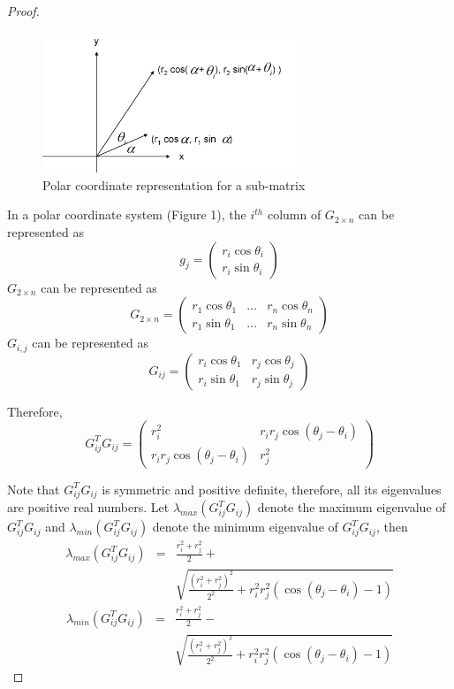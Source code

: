 \documentclass{sig-alternate}
\begin{document}
\begin{proof}
\begin{figure}
\centering
\includegraphics[width=3in]{opt_2erasures.png}
\caption{Polar coordinate representation for a sub-matrix}
\label{polar}
\end{figure}

In a polar coordinate system (Figure 1), the $i^{th}$ column of $G_{2 \times n}$ can be represented as
\[ g_j= \left( \begin{array}{c}
r_i \cos \theta_i  \\
r_i \sin \theta_i  \end{array} \right)\]
$ G_{2 \times n} $ can be represented as 
\[ G_{2 \times n} = \left( \begin{array}{ccc}
r_1 \cos \theta_1 & \ldots & r_n \cos \theta_n \\
r_1 \sin \theta_1 & \ldots & r_n \sin \theta_n    \end{array} \right)\]
$G_{i,j}$ can be represented as 
\[ G_{ij}= \left( \begin{array}{cc}
r_i \cos \theta_1 & r_j \cos \theta_j \\
r_i \sin \theta_1 & r_j \sin \theta_j    \end{array} \right)\]

Therefore,
\[ G_{ij}^T G_{ij}= \left( \begin{array}{cc}
r_i^2 & r_i r_j \cos (\theta_j- \theta_i) \\
r_i r_j \cos (\theta_j- \theta_i) &   r_j^2  \end{array} \right)\]

Note that $G_{ij}^T G_{ij}$ is symmetric and positive definite,
therefore, all its eigenvalues are positive real numbers.
Let $\lambda_{max} (G_{ij}^{T} G_{ij})$ denote the maximum eigenvalue
of $G_{ij}^{T} G_{ij}$ and $\lambda_{min} (G_{ij}^{T} G_{ij})$ denote 
the minimum eigenvalue of $G_{ij}^{T} G_{ij}$, then
\begin{eqnarray*}
\lambda_{max} (G_{ij}^{T} G_{ij})
&=& \frac{ r_{i}^2 + r_{j}^2}{2 } + \\
& &   \sqrt { \frac{ (r_{i}^2 + r_{j}^2)^2}{2^2 } + 
r_{i}^2 r_{j}^2 (\cos (\theta_j - \theta_i)  -1 )}
\end{eqnarray*}
\begin{eqnarray*}
\lambda_{min} (G_{ij}^{T} G_{ij})
&=& \frac{ r_{i}^2 + r_{j}^2}{2 } - \\
& &  \sqrt { \frac{ (r_{i}^2 + r_{j}^2)^2}{2^2 } + 
r_{i}^2 r_{j}^2 (\cos (\theta_j - \theta_i)  -1 )}
\end{eqnarray*}


\end{proof}
\end{document}
